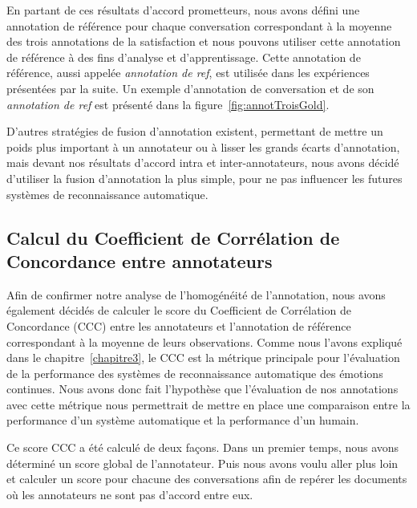 
En partant de ces résultats d’accord prometteurs, nous avons défini une annotation de référence pour chaque conversation correspondant à la moyenne des trois annotations de la satisfaction et nous pouvons utiliser cette annotation de référence à des fins d’analyse et d’apprentissage. Cette annotation de référence, aussi appelée \textit{annotation de ref}, est utilisée dans les expériences présentées par la suite. Un exemple d'annotation de conversation et de son \textit{annotation de ref} est présenté dans la figure~\ref{fig:annotTroisGold}.

D'autres stratégies de fusion d'annotation existent, permettant de mettre un poids plus important à un annotateur ou à lisser les grands écarts d'annotation, mais devant nos résultats d'accord intra et inter-annotateurs, nous avons décidé d'utiliser la fusion d'annotation la plus simple, pour ne pas influencer les futures systèmes de reconnaissance automatique.

\subsection{Calcul du Coefficient de Corrélation de Concordance entre annotateurs}
Afin de confirmer notre analyse de l'homogénéité de l'annotation, nous avons également décidés de calculer le score du  Coefficient de Corrélation de Concordance (CCC) entre les annotateurs et l'annotation de référence correspondant à la moyenne de leurs observations.
Comme nous l'avons expliqué dans le chapitre~\ref{chapitre3}, le CCC est la métrique principale pour l'évaluation de la performance des systèmes de reconnaissance automatique des émotions continues. Nous avons donc fait l'hypothèse que l'évaluation de nos annotations avec cette métrique nous permettrait de mettre en place une comparaison entre la performance d'un système automatique et la performance d'un humain.

Ce score CCC a été calculé de deux façons. Dans un premier temps, nous avons déterminé un score global de l'annotateur. Puis nous avons voulu aller plus loin et calculer un score pour chacune des conversations afin de repérer les documents où les annotateurs ne sont pas d'accord entre eux.




